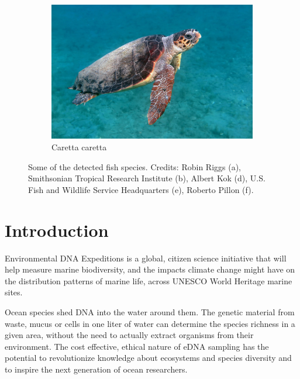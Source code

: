 \documentclass[10pt]{article}
\begin{document}
\begin{figure}[h]
\begin{subfigure}[b]{0.48\textwidth}
         \includegraphics[width=\textwidth]{images/caretta_caretta.jpg}
         \caption{Caretta caretta}
     \end{subfigure}
     \caption{Some of the detected fish species. Credits: Robin Riggs (a), Smithsonian Tropical Research Institute (b), Albert Kok (d), U.S. Fish and Wildlife Service Headquarters (e), Roberto Pillon (f).}
\end{figure}

\clearpage

\section*{Introduction}

\begin{multicols}{2}
Environmental DNA Expeditions is a global, citizen science initiative that will help measure marine biodiversity, and the impacts climate change might have on the distribution patterns of marine life, across UNESCO World Heritage marine sites.

Ocean species shed DNA into the water around them. The genetic material from waste, mucus or cells in one liter of water can determine the species richness in a given area, without the need to actually extract organisms from their environment.
The cost effective, ethical nature of eDNA sampling has the potential to revolutionize knowledge about ecosystems and species diversity and to inspire the next generation of ocean researchers.
\end{multicols}
\end{document}
